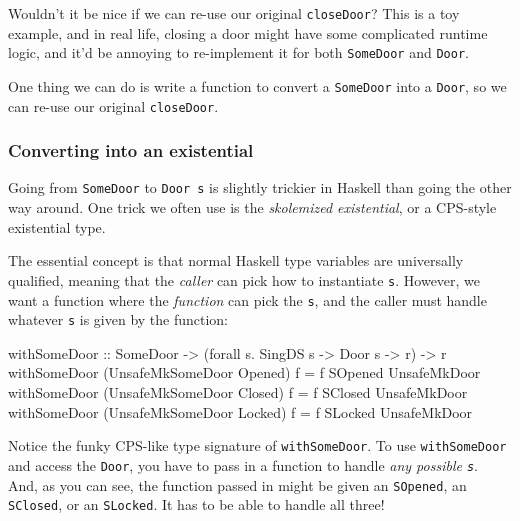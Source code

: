 \documentclass[]{article}
\newenvironment{Shaded}{}{}
\newcommand{\DataTypeTok}[1]{\textcolor[rgb]{0.56,0.13,0.00}{#1}}
\newcommand{\OtherTok}[1]{\textcolor[rgb]{0.00,0.44,0.13}{#1}}
\newcommand{\FunctionTok}[1]{\textcolor[rgb]{0.02,0.16,0.49}{#1}}
\newcommand{\NormalTok}[1]{#1}
\begin{document}
Wouldn't it be nice if we can re-use our original \texttt{closeDoor}? This is a
toy example, and in real life, closing a door might have some complicated
runtime logic, and it'd be annoying to re-implement it for both
\texttt{SomeDoor} and \texttt{Door}.

One thing we can do is write a function to convert a \texttt{SomeDoor} into a
\texttt{Door}, so we can re-use our original \texttt{closeDoor}.

\subsubsection{Converting into an
existential}\label{converting-into-an-existential}

Going from \texttt{SomeDoor} to \texttt{Door\ s} is slightly trickier in Haskell
than going the other way around. One trick we often use is the \emph{skolemized
existential}, or a CPS-style existential type.

The essential concept is that normal Haskell type variables are universally
qualified, meaning that the \emph{caller} can pick how to instantiate
\texttt{s}. However, we want a function where the \emph{function} can pick the
\texttt{s}, and the caller must handle whatever \texttt{s} is given by the
function:

\begin{Shaded}
\begin{Highlighting}[]
\OtherTok{withSomeDoor ::} \DataTypeTok{SomeDoor} \OtherTok{->}\NormalTok{ (forall s}\FunctionTok{.} \DataTypeTok{SingDS}\NormalTok{ s }\OtherTok{->} \DataTypeTok{Door}\NormalTok{ s }\OtherTok{->}\NormalTok{ r) }\OtherTok{->}\NormalTok{ r}
\NormalTok{withSomeDoor (}\DataTypeTok{UnsafeMkSomeDoor} \DataTypeTok{Opened}\NormalTok{) f }\FunctionTok{=}\NormalTok{ f }\DataTypeTok{SOpened} \DataTypeTok{UnsafeMkDoor}
\NormalTok{withSomeDoor (}\DataTypeTok{UnsafeMkSomeDoor} \DataTypeTok{Closed}\NormalTok{) f }\FunctionTok{=}\NormalTok{ f }\DataTypeTok{SClosed} \DataTypeTok{UnsafeMkDoor}
\NormalTok{withSomeDoor (}\DataTypeTok{UnsafeMkSomeDoor} \DataTypeTok{Locked}\NormalTok{) f }\FunctionTok{=}\NormalTok{ f }\DataTypeTok{SLocked} \DataTypeTok{UnsafeMkDoor}
\end{Highlighting}
\end{Shaded}

Notice the funky CPS-like type signature of \texttt{withSomeDoor}. To use
\texttt{withSomeDoor} and access the \texttt{Door}, you have to pass in a
function to handle \emph{any possible \texttt{s}}. And, as you can see, the
function passed in might be given an \texttt{SOpened}, an \texttt{SClosed}, or
an \texttt{SLocked}. It has to be able to handle all three!
\end{document}
